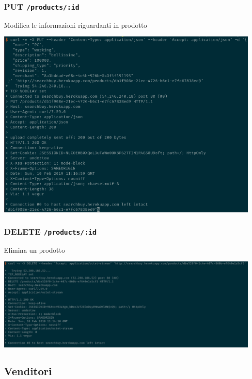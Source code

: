 \documentclass[11pt]{article}
\begin{document}
\subsubsection{PUT \texttt{/products/:id}}
\label{sec:orgd58623e}
Modifica le informazioni riguardanti in prodotto
\begin{center}
\includegraphics[width=.9\linewidth]{img/products-screen/put-product.png}
\end{center}
\subsubsection{DELETE \texttt{/products/:id}}
\label{sec:org9985267}
Elimina un prodotto
\begin{center}
\includegraphics[width=.9\linewidth]{img/products-screen/delete-product.png}
\end{center}

\subsection{Venditori}
\label{sec:orgdc0146d}
\end{document}

